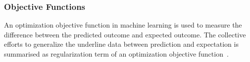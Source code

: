 \subsubsection{Objective Functions}
An optimization objective function in machine learning is used to measure the difference between the predicted outcome and expected outcome. The collective efforts to generalize the underline data  between prediction and expectation is summarised as regularization term of an optimization objective function~\cite{goodfellow_2015}.  